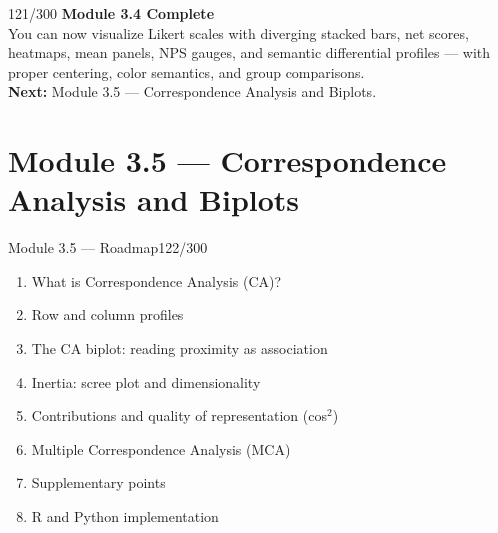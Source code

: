 \documentclass[10pt]{beamer}
\newcommand{\smark}[1]{\hfill{\scriptsize\color{codegray}#1}}
\begin{document}
\begin{frame}{}\smark{121/300}
\centering\vspace{1.5cm}
{\Large\textbf{Module 3.4 Complete}}\\[0.5cm]
You can now visualize Likert scales with diverging stacked bars, net scores, heatmaps, mean panels, NPS gauges, and semantic differential profiles --- with proper centering, color semantics, and group comparisons.\\[0.5cm]
\textbf{Next:} Module 3.5 --- Correspondence Analysis and Biplots.
\end{frame}

\section{Module 3.5 --- Correspondence Analysis and Biplots}

\begin{frame}{Module 3.5 --- Roadmap}\smark{122/300}
\begin{enumerate}
    \item What is Correspondence Analysis (CA)?
    \item Row and column profiles
    \item The CA biplot: reading proximity as association
    \item Inertia: scree plot and dimensionality
    \item Contributions and quality of representation (cos$^2$)
    \item Multiple Correspondence Analysis (MCA)
    \item Supplementary points
    \item R and Python implementation
\end{enumerate}
\end{frame}
\end{document}

